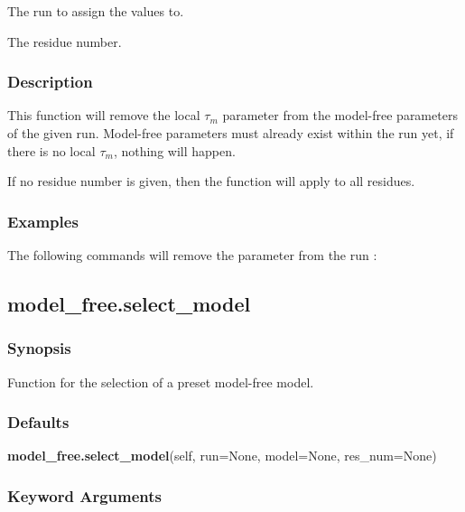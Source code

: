   The run to assign the values to. 

  The residue number. 




\subsubsection{Description}

This function will remove the local $\tau_m$ parameter from the model-free parameters of the given run.  Model-free parameters must already exist within the run yet, if there is no local $\tau_m$, nothing will happen.


If no residue number is given, then the function will apply to all residues.



\subsubsection{Examples}

The following commands will remove the parameter  from the run :






\newpage

\subsection{model\_free.select\_model}


\subsubsection{Synopsis}

Function for the selection of a preset model-free model.



\subsubsection{Defaults}

\textsf{\textbf{model\_free.select\_model}(self, run=None, model=None, res\_num=None)}


\subsubsection{Keyword Arguments}

